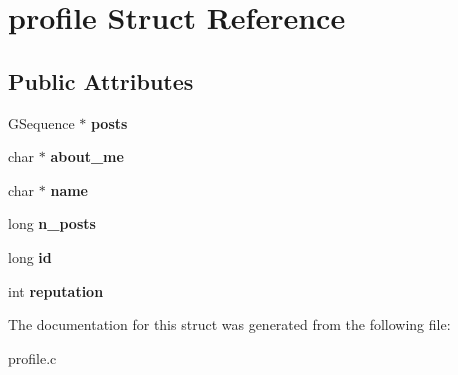 \hypertarget{structprofile}{}\section{profile Struct Reference}
\label{structprofile}
\subsection*{Public Attributes}
\begin{DoxyCompactItemize}
\item 
G\+Sequence $\ast$ {\bfseries posts}\hypertarget{structprofile_a904f03d1bb06b9ec115ed9c416c50800}{}\label{structprofile_a904f03d1bb06b9ec115ed9c416c50800}

\item 
char $\ast$ {\bfseries about\+\_\+me}\hypertarget{structprofile_afc8d31d3252cc322e4b03f91f2d32806}{}\label{structprofile_afc8d31d3252cc322e4b03f91f2d32806}

\item 
char $\ast$ {\bfseries name}\hypertarget{structprofile_a9604b6495d24664b950fa3fe76dc9e69}{}\label{structprofile_a9604b6495d24664b950fa3fe76dc9e69}

\item 
long {\bfseries n\+\_\+posts}\hypertarget{structprofile_a65f22f458d057db926086e94cff4fa7c}{}\label{structprofile_a65f22f458d057db926086e94cff4fa7c}

\item 
long {\bfseries id}\hypertarget{structprofile_affebf6e243c4ef417e9da845ab2bf0f3}{}\label{structprofile_affebf6e243c4ef417e9da845ab2bf0f3}

\item 
int {\bfseries reputation}\hypertarget{structprofile_a41b753aa726ae5a9883c0493c416e144}{}\label{structprofile_a41b753aa726ae5a9883c0493c416e144}

\end{DoxyCompactItemize}


The documentation for this struct was generated from the following file\+:\begin{DoxyCompactItemize}
\item 
profile.\+c\end{DoxyCompactItemize}
